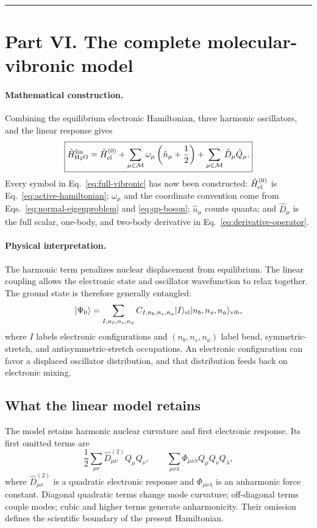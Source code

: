 \documentclass[10pt,twocolumn]{article}
\newcommand{\ket}[1]{\lvert #1\rangle}
\newcommand{\conceptbreak}{%
  \par\medskip\noindent
  {\color{black!30}\rule{\columnwidth}{0.35pt}}%
  \par\medskip}
\newcommand{\mathderiv}{\paragraph{Mathematical construction.}}
\newcommand{\physical}{\paragraph{Physical interpretation.}}
\begin{document}
\conceptbreak

\section*{Part VI. The complete molecular-vibronic model}

\mathderiv Combining the equilibrium electronic Hamiltonian, three harmonic
oscillators, and the linear response gives
\begin{equation}
\boxed{
\hat H_{\rm H_2O}^{\rm lin}=\hat H_{\rm el}^{(0)}
+\sum_{\mu\in\mathcal M}\omega_\mu\left(\hat n_\mu+\frac12\right)
+\sum_{\mu\in\mathcal M}\hat D_\mu\hat Q_\mu.}
\label{eq:full-vibronic}
\end{equation}
Every symbol in Eq.~\eqref{eq:full-vibronic} has now been constructed:
$\hat H_{\rm el}^{(0)}$ is Eq.~\eqref{eq:active-hamiltonian}; $\omega_\mu$ and
the coordinate convention come from Eqs.~\eqref{eq:normal-eigenproblem} and
\eqref{eq:qp-boson}; $\hat n_\mu$ counts quanta; and $\hat D_\mu$ is the full
scalar, one-body, and two-body derivative in
Eq.~\eqref{eq:derivative-operator}.

\physical The harmonic term penalizes nuclear displacement from equilibrium.
The linear coupling allows the electronic state and oscillator wavefunction to
relax together.  The ground state is therefore generally entangled:
\begin{equation}
\ket{\Psi_0}=\sum_{I,n_b,n_s,n_a}
C_{I,n_b,n_s,n_a}\ket{I}_{\rm el}
\ket{n_b,n_s,n_a}_{\rm vib},
\label{eq:entangled-state}
\end{equation}
where $I$ labels electronic configurations and $(n_b,n_s,n_a)$ label bend,
symmetric-stretch, and antisymmetric-stretch occupations.  An electronic
configuration can favor a displaced oscillator distribution, and that
distribution feeds back on electronic mixing.

\subsection*{What the linear model retains}

The model retains harmonic nuclear curvature and first electronic response.
Its first omitted terms are
\begin{equation}
\frac12\sum_{\mu\nu}\hat D^{(2)}_{\mu\nu}Q_\mu Q_\nu,
\qquad
\sum_{\mu\nu\lambda}\Phi_{\mu\nu\lambda}Q_\mu Q_\nu Q_\lambda,
\label{eq:omitted-terms}
\end{equation}
where $\hat D^{(2)}_{\mu\nu}$ is a quadratic electronic response and
$\Phi_{\mu\nu\lambda}$ is an anharmonic force constant.  Diagonal quadratic
terms change mode curvature; off-diagonal terms couple modes; cubic and higher
terms generate anharmonicity.  Their omission defines the scientific boundary
of the present Hamiltonian.
\end{document}
